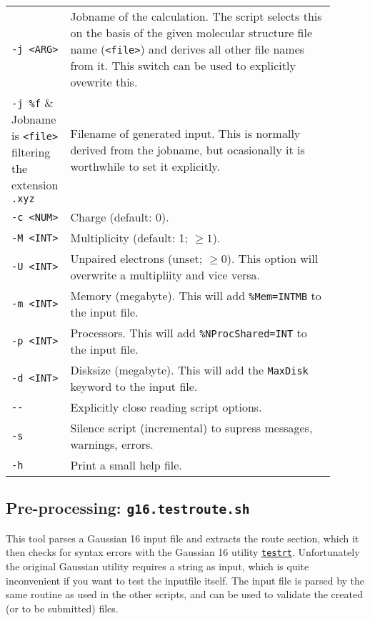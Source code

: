\documentclass[   %
  final,          %
  a4paper         %
]{article}
\begin{document}
\begin{longtable}{p{0.1\linewidth}p{0.8\linewidth}}
  {\lstinline`-j <ARG>`} & Jobname of the calculation.
    The script selects this on the basis of the given molecular structure file name ({\lstinline`<file>`})
    and derives all other file names from it. This switch can be used to explicitly ovewrite this. \\
  {\lstinline`-j %f`}    & Jobname is {\lstinline`<file>`} filtering the extension \texttt{.xyz} \\
  {\lstinline`-j %s`}    & Jobname is {\lstinline`<file>`} filtering the extension \texttt{start.xyz} \\
  {\lstinline`-f <ARG>`} & Filename of generated input.
    This is normally derived from the jobname, but ocasionally it is worthwhile to set it explicitly. \\
  {\lstinline`-c <NUM>`} & Charge (default: 0). \\
  {\lstinline`-M <INT>`} & Multiplicity (default: 1; \( \geq 1 \)). \\
  {\lstinline`-U <INT>`} & Unpaired electrons (unset; \( \geq 0 \)). 
    This option will overwrite a multipliity and vice versa.\\
  {\lstinline`-m <INT>`} & Memory (megabyte). This will add \texttt{\%Mem={\lstinline`INT`}MB} to the input file. \\
  {\lstinline`-p <INT>`} & Processors. This will add \texttt{\%NProcShared={\lstinline`INT`}} to the input file. \\
  {\lstinline`-d <INT>`} & Disksize (megabyte). This will add the \texttt{MaxDisk} keyword to the input file. \\
  {\lstinline`--`}       & Explicitly close reading script options. \\
  {\lstinline`-s`}       & Silence script (incremental) to supress messages, warnings, errors. \\
  {\lstinline`-h`}       & Print a small help file. \\
\end{longtable}

\subsection{Pre-processing: \texorpdfstring{{\lstinline`g16.testroute.sh`}}{g16.testroute.sh}}

This tool parses a Gaussian 16 input file and extracts the route section, 
which it then checks for syntax errors with the Gaussian 16 utility 
\href{http://gaussian.com/testrt/}{\texttt{testrt}}.
Unfortunately the original Gaussian utility requires a string as input, 
which is quite inconvenient if you want to test the inputfile itself.
The input file is parsed by the same routine as used in the other scripts,
and can be used to validate the created (or to be submitted) files.
\end{document}
